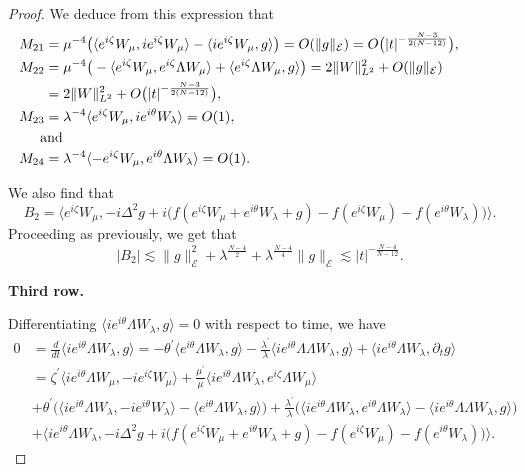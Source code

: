 \documentclass[a4paper,two-side,10pt]{amsart}
\numberwithin{equation}{section}
\begin{document}
\begin{proof}
We deduce from this expression that
\begin{align*}
M_{21} &= \mu^{-4}\big( \langle  e^{i\zeta}  W_\mu , i e^{i\zeta} W_\mu \rangle - \langle i e^{i\zeta}  W_\mu ,g \rangle\big)  = O(\|g\|_{\mathcal{E}})=O\big(|t|^{-\frac{N-3}{2(N-12)}}\big),\\ 
M_{22}&= \mu^{-4}  \big(-\langle   e^{i\zeta}  W_\mu , e^{i\zeta} \Lambda W_\mu\rangle + \langle  e^{i\zeta}  \Lambda W_\mu ,g \rangle\big) =2\|W\|_{L^2}^2 + O(\|g\|_{\mathcal{E}})\\
&= 2 \|W\|_{L^2}^2 +O\big(|t|^{-\frac{N-3}{2(N-12)}}\big),\\
M_{23}&= \lambda^{-4}  \langle e^{i\zeta}  W_\mu ,i e^{i\theta} W_\lambda \rangle  =O(1),\\
\noalign{and}
M_{24}&= \lambda^{-4}  \langle -e^{i\zeta}  W_\mu ,e^{i\theta} \Lambda W_\lambda \rangle =O(1). 
\end{align*}

We also find that
$$B_2 =  \big\langle  e^{i\zeta}  W_\mu , -i \Delta^2 g +i \big(f(e^{i\zeta} W_\mu +e^{i\theta} W_\lambda +g) - f(e^{i\zeta} W_\mu) - f(e^{i\theta} W_\lambda)\big) \big\rangle. $$
Proceeding as previously, we get that
$$|B_2|  \lesssim  \|g\|_{\mathcal{E}}^2+\lambda^{\frac{N-4}{2}}+ \lambda^{\frac{N-4}{4}} \|g\|_{\mathcal{E}}\lesssim 
|t|^{-\frac{N-4}{N-12}}.$$



{\bf Third row.} 

Differentiating $\langle ie^{i\theta}\Lambda  W_\lambda ,g\rangle =0$ with respect to time, we have
\begin{align*}
0&= \frac{d}{dt} \langle ie^{i\theta}\Lambda W_\lambda ,g\rangle = - \theta^\prime \langle e^{i\theta} \Lambda W_\lambda ,g \rangle - \frac{\lambda^\prime}{\lambda} \langle ie^{i\theta} \Lambda  \Lambda W_\lambda ,g \rangle + \langle ie^{i\theta}\Lambda  W_\lambda ,\partial_t g \rangle \\
&= \zeta^\prime \langle i e^{i\theta}\Lambda  W_\mu ,- i e^{i\zeta} W_\mu \rangle  +\frac{\mu^\prime}{\mu} \langle  i e^{i\theta} \Lambda W_\lambda , e^{i\zeta} \Lambda W_\mu\rangle\\
&+\theta^\prime \big(\langle ie^{i\theta}\Lambda  W_\lambda ,-i e^{i\theta} W_\lambda \rangle - \langle e^{i\theta} \Lambda W_\lambda ,g\rangle\big) +\frac{\lambda^\prime}{\lambda}\big( \langle ie^{i\theta} \Lambda  W_\lambda , e^{i\theta} \Lambda W_\lambda \rangle -\langle ie^{i\theta} \Lambda \Lambda W_\lambda ,g \rangle \big) \\
&+ \big\langle i e^{i\theta} \Lambda  W_\lambda , -i \Delta^2 g +i \big(f(e^{i\zeta} W_\mu +e^{i\theta} W_\lambda +g) - f(e^{i\zeta} W_\mu) - f(e^{i\theta} W_\lambda)\big) \big\rangle .
\end{align*}


\end{proof}
\end{document}

